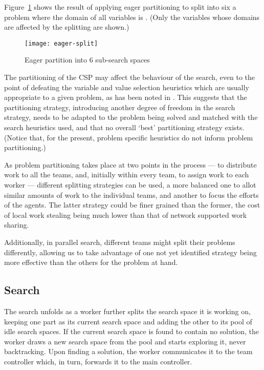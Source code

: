 \documentclass{llncs}
\begin{document}
Figure~\ref{fig:eager} shows the result of applying eager partitioning
to split into six a problem where the domain of all variables is
. (Only the variables whose
domains are affected by the splitting are shown.)

\begin{figure}[h]
  \centering
  \texttt{[image: eager-split]}
  \caption{Eager partition into 6 sub-search spaces}
  \label{fig:eager}
\end{figure}

The partitioning of the CSP may affect the behaviour of the search,
even to the point of defeating the variable and value selection
heuristics which are usually appropriate to a given problem, as has
been noted in \cite[Section~6]{hent07:parallel-CSP}. This suggests
that the partitioning strategy, introducing another degree of freedom
in the search strategy, needs to be adapted to the problem being
solved and matched with the search heuristics used, and that no
overall `best' partitioning strategy exists. (Notice that, for the
present, problem specific heuristics do not inform problem
partitioning.)

As problem partitioning takes place at two points in the process ---
to distribute work to all the teams, and, initially within every team,
to assign work to each worker --- different splitting strategies can
be used, a more balanced one to allot similar amounts of work to the
individual teams, and another to focus the efforts of the agents. The
latter strategy could be finer grained than the former, the cost of
local work stealing being much lower than that of network supported
work sharing.

Additionally, in parallel search, different teams might split their
problems differently, allowing us to take advantage of one not yet
identified strategy being more effective than the others for the
problem at hand.

\subsection{Search}

The search unfolds as a worker further splits the search space it is
working on, keeping one part as its current search space and adding
the other to its pool of idle search spaces. If the current search
space is found to contain no solution, the worker draws a new search
space from the pool and starts exploring it, never backtracking. Upon
finding a solution, the worker communicates it to the team controller
which, in turn, forwards it to the main controller.
\end{document}
